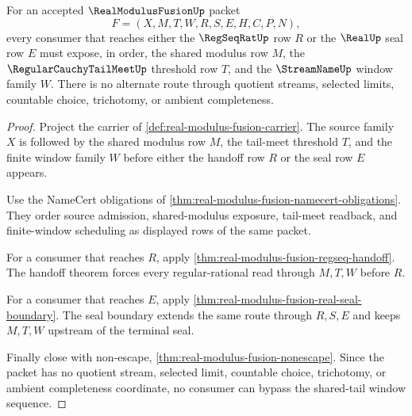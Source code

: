 \begin{theorem}
\label{thm:real-modulus-fusion-shared-tail-window-exhaustion}
For an accepted $\RealModulusFusionUp$ packet
$$
F=(X,M,T,W,R,S,E,H,C,P,N),
$$
every consumer that reaches either the $\RegSeqRatUp$ row $R$ or the $\RealUp$ seal row $E$ must expose, in order, the shared modulus row $M$, the $\RegularCauchyTailMeetUp$ threshold row $T$, and the $\StreamNameUp$ window family $W$. There is no alternate route through quotient streams, selected limits, countable choice, trichotomy, or ambient completeness.
\end{theorem}
\begin{proof}
Project the carrier of \autoref{def:real-modulus-fusion-carrier}. The source family $X$ is followed by the shared modulus row $M$, the tail-meet threshold $T$, and the finite window family $W$ before either the handoff row $R$ or the seal row $E$ appears.

Use the NameCert obligations of \autoref{thm:real-modulus-fusion-namecert-obligations}. They order source admission, shared-modulus exposure, tail-meet readback, and finite-window scheduling as displayed rows of the same packet.

For a consumer that reaches $R$, apply \autoref{thm:real-modulus-fusion-regseq-handoff}. The handoff theorem forces every regular-rational read through $M,T,W$ before $R$.

For a consumer that reaches $E$, apply \autoref{thm:real-modulus-fusion-real-seal-boundary}. The seal boundary extends the same route through $R,S,E$ and keeps $M,T,W$ upstream of the terminal seal.

Finally close with non-escape, \autoref{thm:real-modulus-fusion-nonescape}. Since the packet has no quotient stream, selected limit, countable choice, trichotomy, or ambient completeness coordinate, no consumer can bypass the shared-tail window sequence.
\end{proof}

